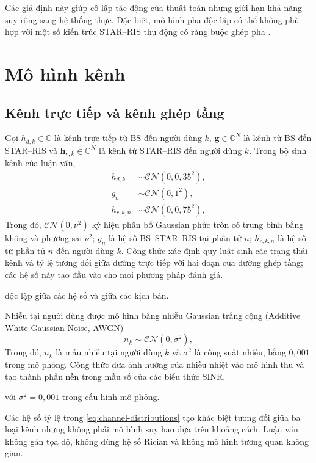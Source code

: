 Các giả định này giúp cô lập tác động của thuật toán nhưng giới hạn khả năng suy rộng sang hệ thống thực. Đặc biệt, mô hình pha độc lập có thể không phù hợp với một số kiến trúc STAR--RIS thụ động có ràng buộc ghép pha \cite{Liu2021STARCoupledPhase,Wang2022STAROptimization}.

\section{Mô hình kênh}
\subsection{Kênh trực tiếp và kênh ghép tầng}
Gọi $h_{d,k}\in\mathbb{C}$ là kênh trực tiếp từ BS đến người dùng $k$, $\bm g\in\mathbb{C}^{N}$ là kênh từ BS đến STAR--RIS và $\bm h_{r,k}\in\mathbb{C}^{N}$ là kênh từ STAR--RIS đến người dùng $k$. Trong bộ sinh kênh của luận văn,
\begin{align}
 h_{d,k}&\sim\mathcal{CN}(0,0{,}35^2),\\
 g_n&\sim\mathcal{CN}(0,1^2),\\
 h_{r,k,n}&\sim\mathcal{CN}(0,0{,}75^2),
 \label{eq:channel-distributions}
\end{align}
Trong đó, $\mathcal{CN}(0,\nu^2)$ ký hiệu phân bố Gaussian phức tròn có trung bình bằng không và phương sai $\nu^2$; $g_n$ là hệ số BS--STAR--RIS tại phần tử $n$; $h_{r,k,n}$ là hệ số từ phần tử $n$ đến người dùng $k$. Công thức xác định quy luật sinh các trạng thái kênh và tỷ lệ tương đối giữa đường trực tiếp với hai đoạn của đường ghép tầng; các hệ số này tạo đầu vào cho mọi phương pháp đánh giá.

độc lập giữa các hệ số và giữa các kịch bản.

Nhiễu tại người dùng được mô hình bằng nhiễu Gaussian trắng cộng (Additive White Gaussian Noise, AWGN)
\begin{equation}
 n_k\sim\mathcal{CN}(0,\sigma^2),
\end{equation}
Trong đó, $n_k$ là mẫu nhiễu tại người dùng $k$ và $\sigma^2$ là công suất nhiễu, bằng $0{,}001$ trong mô phỏng. Công thức đưa ảnh hưởng của nhiễu nhiệt vào mô hình thu và tạo thành phần nền trong mẫu số của các biểu thức SINR.

với $\sigma^2=0{,}001$ trong cấu hình mô phỏng.

Các hệ số tỷ lệ trong \eqref{eq:channel-distributions} tạo khác biệt tương đối giữa ba loại kênh nhưng không phải mô hình suy hao dựa trên khoảng cách. Luận văn không gán tọa độ, không dùng hệ số Rician và không mô hình tương quan không gian.

